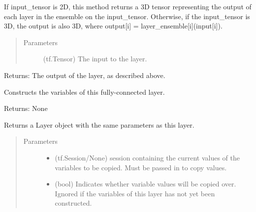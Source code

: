 \documentclass[letterpaper,10pt,english,openany,oneside]{sphinxmanual}
\begin{document}
\begin{fulllineitems}
\begin{fulllineitems}
If input\_tensor is 2D, this method returns a 3D tensor representing the output of each
layer in the ensemble on the input\_tensor. Otherwise, if the input\_tensor is 3D, the output
is also 3D, where output{[}i{]} = layer\_ensemble{[}i{]}(input{[}i{]}).
\begin{quote}\begin{description}
\item[{Parameters}] \leavevmode
{} \textendash{} (tf.Tensor) The input to the layer.

\end{description}\end{quote}

Returns: The output of the layer, as described above.

\end{fulllineitems}


\begin{fulllineitems}
\label{\detokenize{_modules/layers:layers.FC.FC.construct_vars}}
Constructs the variables of this fully-connected layer.

Returns: None

\end{fulllineitems}


\begin{fulllineitems}
\label{\detokenize{_modules/layers:layers.FC.FC.copy}}
Returns a Layer object with the same parameters as this layer.
\begin{quote}\begin{description}
\item[{Parameters}] \leavevmode\begin{itemize}
\item {} 
 \textendash{} (tf.Session/None) session containing the current values of the variables to be copied. Must be passed in to copy values.

\item {} 
 \textendash{} (bool) Indicates whether variable values will be copied over. Ignored if the variables of this layer has not yet been constructed.


\end{itemize}
\end{description}
\end{quote}
\end{fulllineitems}
\end{fulllineitems}
\end{document}
